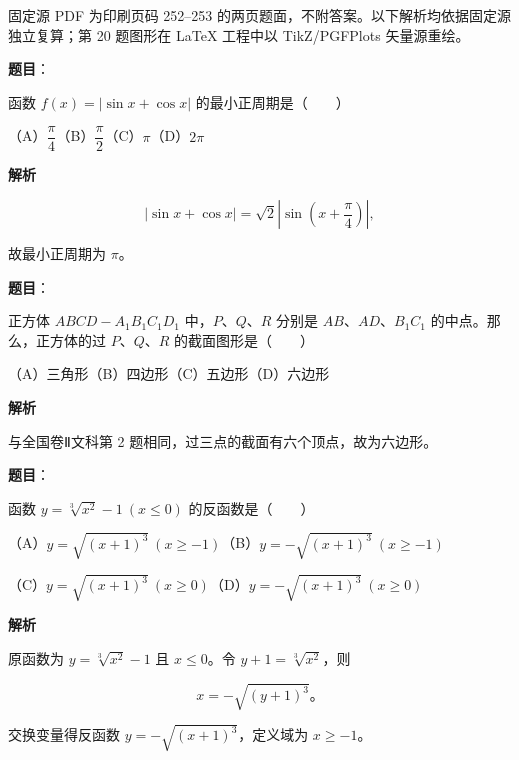 

\begin{gktip}
固定源 PDF 为印刷页码 252–253 的两页题面，不附答案。以下解析均依据固定源独立复算；第 20 题图形在 LaTeX 工程中以 TikZ/PGFPlots 矢量源重绘。
\end{gktip}

\begin{answer}

\textbf{题目}：

函数 $f(x)=|\sin x+\cos x|$ 的最小正周期是\mbox{（　　）}

（A）$\dfrac{\pi}{4}$\quad（B）$\dfrac{\pi}{2}$\quad（C）$\pi$\quad（D）$2\pi$

\textbf{解析}

\nopagebreak[4]
\[
|\sin x+\cos x|=\sqrt2\left|\sin\left(x+\frac\pi4\right)\right|,
\]

故最小正周期为 $\pi$。


\end{answer}
\begin{answer}

\textbf{题目}：

正方体 $ABCD-A_1B_1C_1D_1$ 中，$P\text{、}Q\text{、}R$ 分别是 $AB\text{、}AD\text{、}B_1C_1$ 的中点。那么，正方体的过 $P\text{、}Q\text{、}R$ 的截面图形是\mbox{（　　）}

（A）三角形\quad（B）四边形\quad（C）五边形\quad（D）六边形

\textbf{解析}

与全国卷Ⅱ文科第 2 题相同，过三点的截面有六个顶点，故为六边形。


\end{answer}
\begin{answer}

\textbf{题目}：

函数 $y=\sqrt[3]{x^2}-1\ (x\leqslant0)$ 的反函数是\mbox{（　　）}

（A）$y=\sqrt{(x+1)^3}\ (x\geqslant-1)$\quad（B）$y=-\sqrt{(x+1)^3}\ (x\geqslant-1)$

（C）$y=\sqrt{(x+1)^3}\ (x\geqslant0)$\quad（D）$y=-\sqrt{(x+1)^3}\ (x\geqslant0)$

\textbf{解析}

原函数为 $y=\sqrt[3]{x^2}-1$ 且 $x\leqslant0$。令 $y+1=\sqrt[3]{x^2}$，则

\nopagebreak[4]
\[
x=-\sqrt{(y+1)^3}\text{。}
\]

交换变量得反函数 $y=-\sqrt{(x+1)^3}$，定义域为 $x\geqslant-1$。


\end{answer}
